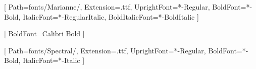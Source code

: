

\usepackage{xcolor}
\usepackage{fontspec}
\usepackage{graphicx}
\usepackage{pdfpages}
\usepackage{titlesec}
\usepackage{hyperref}
\usepackage{enumitem}
\usepackage{booktabs}
\usepackage{longtable}
\usepackage{float}
\usepackage{microtype}
\usepackage{caption}
\usepackage{tocloft}
\usepackage{etoolbox}
\usepackage{fancyhdr}
\usepackage{afterpage}
\usepackage{lscape}
\usepackage{multicol}


\usepackage{tcolorbox}


\newcommand{\blandscape}{\begin{landscape}}
\newcommand{\elandscape}{\end{landscape}}






\setmainfont{Marianne}[
  Path=fonts/Marianne/,
  Extension=.ttf,
  UprightFont=*-Regular,
  BoldFont=*-Bold,
  ItalicFont=*-RegularItalic,
  BoldItalicFont=*-BoldItalic
]

\newfontfamily{}[
  BoldFont=Calibri Bold
]

\newfontfamily{}[
  Path=fonts/Spectral/,
  Extension=.ttf,
  UprightFont=*-Regular,
  BoldFont=*-Bold,
  ItalicFont=*-Italic
]

